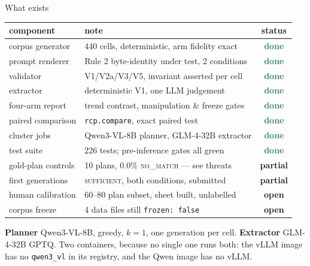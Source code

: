 \documentclass[aspectratio=169,11pt]{beamer}
\newcommand{\done}{\textcolor{seagreen}{\textbf{done}}}
\newcommand{\statuspartial}{\textcolor{amber}{\textbf{partial}}}
\newcommand{\open}{\textcolor{rust}{\textbf{open}}}
\newcommand{\cs}[1]{\textsc{\small #1}}
\begin{document}
\begin{frame}{What exists}

\centering\small
\begin{tabular}{llc}
\toprule
component & note & status \\
\midrule
corpus generator        & 440 cells, deterministic, arm fidelity exact & \done \\
prompt renderer         & Rule 2 byte-identity under test, 2 conditions & \done \\
validator               & V1/V2a/V3/V5, invariant asserted per cell     & \done \\
extractor               & deterministic V1, one LLM judgement           & \done \\
four-arm report         & trend contrast, manipulation \& freeze gates  & \done \\
paired comparison       & \texttt{rcp.compare}, exact paired test       & \done \\
cluster jobs            & Qwen3-VL-8B planner, GLM-4-32B extractor      & \done \\
test suite              & 226 tests; pre-inference gates all green      & \done \\
\midrule
gold-plan controls      & 10 plans, 0.0\% \cs{no\_match} --- see threats & \statuspartial \\
first generations       & \cs{sufficient}, both conditions, submitted   & \statuspartial \\
human calibration       & 60--80 plan subset, sheet built, unlabelled   & \open \\
corpus freeze           & 4 data files still \texttt{frozen: false}     & \open \\
\bottomrule
\end{tabular}

\medskip
\raggedright\footnotesize
\textbf{Planner} Qwen3-VL-8B, greedy, $k{=}1$, one generation per cell.
\textbf{Extractor} GLM-4-32B GPTQ. Two containers, because no single one runs both: the
vLLM image has no \texttt{qwen3\_vl} in its registry, and the Qwen image has no vLLM.

\end{frame}
\end{document}

